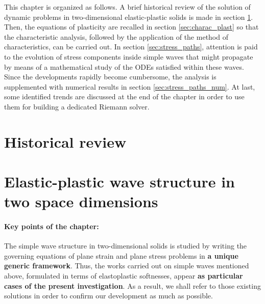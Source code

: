 This chapter is organized as follows.
A brief historical review of the solution of dynamic problems in two-dimensional elastic-plastic solids is made in section \ref{sec:review}.
Then, the equations of plasticity are recalled in section \ref{sec:charac_plast} so that the characteristic analysis, followed by the application of the method of characteristics, can be carried out.
In section \ref{sec:stress_paths}, attention is paid to the evolution of stress components inside simple waves that might propagate by means of a mathematical study of the ODEs satisfied within these waves.
Since the developments rapidly become cumbersome, the analysis is supplemented with numerical results in section \ref{sec:stress_paths_num}.
At last, some identified trends are discussed at the end of the chapter in order to use them for building a dedicated Riemann solver. 

\section{Historical review}
\label{sec:review}




\section{Elastic-plastic wave structure in two space dimensions}
\paragraph*{Key points of the chapter:} The simple wave structure in two-dimensional solids is studied by writing the governing equations of plane strain and plane stress problems in \textbf{a unique generic framework}.
Thus, the works carried out on simple waves mentioned above, formulated in terms of elastoplastic softnesses, appear \textbf{as particular cases of the present investigation}.
As a result, we shall refer to those existing solutions in order to confirm our development as much as possible.

